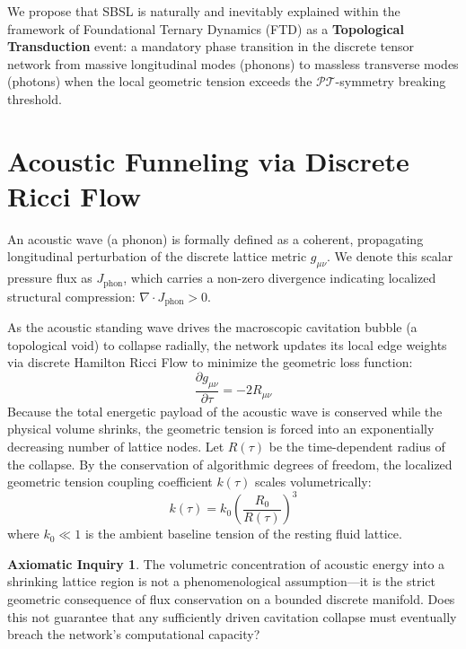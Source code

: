 \documentclass[11pt, letterpaper]{article}
\newcommand{\PT}{\mathcal{PT}}
\theoremstyle{definition}
\newtheorem{inquiry}{Axiomatic Inquiry}[section]
\theoremstyle{remark}
\begin{document}
We propose that SBSL is naturally and inevitably explained within the framework of Foundational Ternary Dynamics (FTD) \cite{Anon2026_Zenodo} as a \textbf{Topological Transduction} event: a mandatory phase transition in the discrete tensor network from massive longitudinal modes (phonons) to massless transverse modes (photons) when the local geometric tension exceeds the $\PT$-symmetry breaking threshold.

\section{Acoustic Funneling via Discrete Ricci Flow}

An acoustic wave (a phonon) is formally defined as a coherent, propagating longitudinal perturbation of the discrete lattice metric $g_{\mu\nu}$. We denote this scalar pressure flux as $J_{\text{phon}}$, which carries a non-zero divergence indicating localized structural compression: $\nabla \cdot J_{\text{phon}} > 0$.

As the acoustic standing wave drives the macroscopic cavitation bubble (a topological void) to collapse radially, the network updates its local edge weights via discrete Hamilton Ricci Flow to minimize the geometric loss function:
\begin{equation}
    \frac{\partial g_{\mu\nu}}{\partial \tau} = -2R_{\mu\nu}
\end{equation}
Because the total energetic payload of the acoustic wave is conserved while the physical volume shrinks, the geometric tension is forced into an exponentially decreasing number of lattice nodes. Let $R(\tau)$ be the time-dependent radius of the collapse. By the conservation of algorithmic degrees of freedom, the localized geometric tension coupling coefficient $k(\tau)$ scales volumetrically:
\begin{equation}
    k(\tau) = k_0 \left( \frac{R_0}{R(\tau)} \right)^3
\end{equation}
where $k_0 \ll 1$ is the ambient baseline tension of the resting fluid lattice.

\begin{inquiry}
The volumetric concentration of acoustic energy into a shrinking lattice region is not a phenomenological assumption---it is the strict geometric consequence of flux conservation on a bounded discrete manifold. Does this not guarantee that any sufficiently driven cavitation collapse must eventually breach the network's computational capacity?
\end{inquiry}
\end{document}
